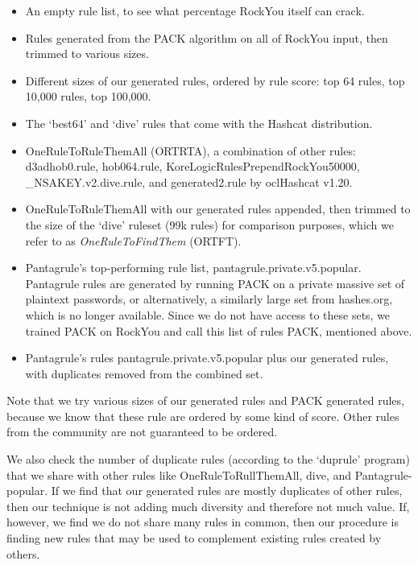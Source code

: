 \documentclass[letterpaper,twocolumn,10pt]{article}
\begin{document}
\begin{itemize}

\item An empty rule list, to see what percentage RockYou itself can crack.

\item Rules generated from the PACK algorithm\cite{PACK} on all of RockYou
input, then trimmed to various sizes.

\item Different sizes of our generated rules, ordered by rule score: top
64 rules, top 10,000 rules, top 100,000.

\item The `best64' and `dive' rules that come with the Hashcat distribution.

\item OneRuleToRuleThemAll (ORTRTA)\cite{ortrta}, a combination of other rules:
d3adhob0.rule, hob064.rule, KoreLogicRulesPrependRockYou50000,
\_NSAKEY.v2.dive.rule, and generated2.rule by oclHashcat v1.20.

\item OneRuleToRuleThemAll with our generated rules appended, then trimmed to
the size of the `dive' ruleset (99k rules) for comparison purposes, which we
refer to as \textit{OneRuleToFindThem} (ORTFT).

\item Pantagrule's\cite{pantagrule} top-performing rule list,
pantagrule.private.v5.popular. Pantagrule rules are generated by running PACK
on a private massive set of plaintext passwords, or alternatively, a similarly
large set from hashes.org, which is no longer available. Since we do not have
access to these sets, we trained PACK on RockYou and call this list of rules
PACK, mentioned above.

\item Pantagrule's rules pantagrule.private.v5.popular plus our generated rules,
with duplicates removed from the combined set.

\end{itemize}

Note that we try various sizes of our generated rules and PACK generated rules,
because we know that these rule are ordered by some kind of score. Other
rules from the community are not guaranteed to be ordered.

We also check the number of duplicate rules (according to the `duprule'
program\cite{duprule}) that we share with other rules like
OneRuleToRullThemAll, dive, and Pantagrule-popular. If we find that our
generated rules are mostly duplicates of other rules, then our technique is not
adding much diversity and therefore not much value. If, however, we find we do
not share many rules in common, then our procedure is finding new rules that
may be used to complement existing rules created by others.
\end{document}
